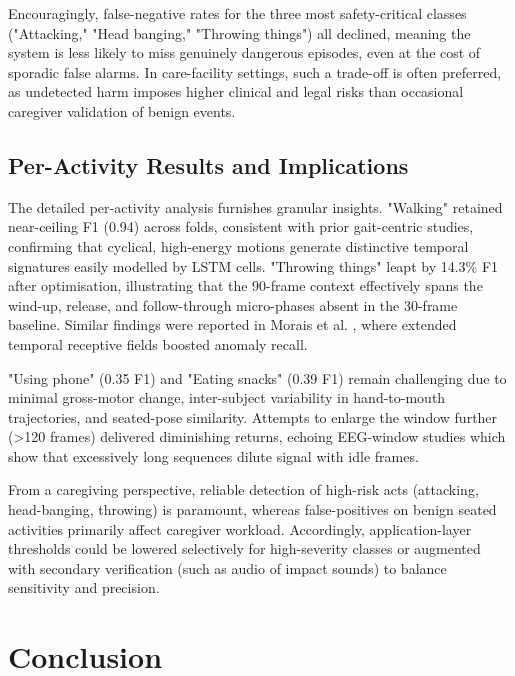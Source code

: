 \documentclass{iopconfser}
\begin{document}
Encouragingly, false-negative rates for the three most safety-critical classes ("Attacking," "Head banging," "Throwing things") all declined, meaning the system is less likely to miss genuinely dangerous episodes, even at the cost of sporadic false alarms. In care-facility settings, such a trade-off is often preferred, as undetected harm imposes higher clinical and legal risks than occasional caregiver validation of benign events.

\subsection{Per-Activity Results and Implications}

The detailed per-activity analysis furnishes granular insights. "Walking" retained near-ceiling F1 (0.94) across folds, consistent with prior gait-centric studies, confirming that cyclical, high-energy motions generate distinctive temporal signatures easily modelled by LSTM cells. "Throwing things" leapt by 14.3\% F1 after optimisation, illustrating that the 90-frame context effectively spans the wind-up, release, and follow-through micro-phases absent in the 30-frame baseline. Similar findings were reported in Morais et al. \cite{morais2019learning}, where extended temporal receptive fields boosted anomaly recall.

"Using phone" (0.35 F1) and "Eating snacks" (0.39 F1) remain challenging due to minimal gross-motor change, inter-subject variability in hand-to-mouth trajectories, and seated-pose similarity. Attempts to enlarge the window further (>120 frames) delivered diminishing returns, echoing EEG-window studies which show that excessively long sequences dilute signal with idle frames.

From a caregiving perspective, reliable detection of high-risk acts (attacking, head-banging, throwing) is paramount, whereas false-positives on benign seated activities primarily affect caregiver workload. Accordingly, application-layer thresholds could be lowered selectively for high-severity classes or augmented with secondary verification (such as audio of impact sounds) to balance sensitivity and precision.

\section{Conclusion}
\end{document}
